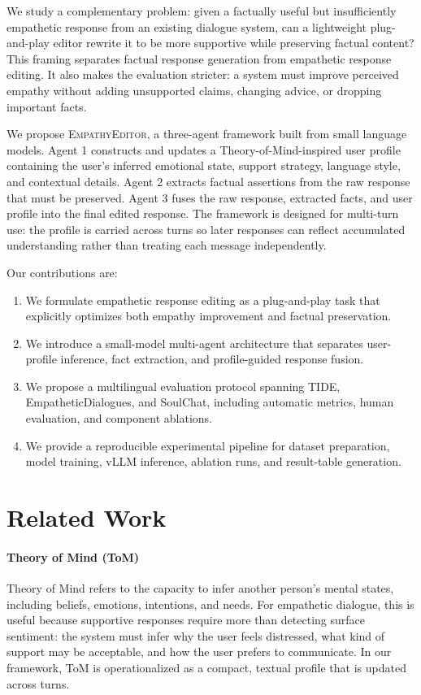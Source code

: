 \documentclass[11pt]{article}
\begin{document}
We study a complementary problem: given a factually useful but insufficiently empathetic response from an existing dialogue system, can a lightweight plug-and-play editor rewrite it to be more supportive while preserving factual content? This framing separates factual response generation from empathetic response editing. It also makes the evaluation stricter: a system must improve perceived empathy without adding unsupported claims, changing advice, or dropping important facts.

We propose \textsc{EmpathyEditor}, a three-agent framework built from small language models. Agent 1 constructs and updates a Theory-of-Mind-inspired user profile containing the user's inferred emotional state, support strategy, language style, and contextual details. Agent 2 extracts factual assertions from the raw response that must be preserved. Agent 3 fuses the raw response, extracted facts, and user profile into the final edited response. The framework is designed for multi-turn use: the profile is carried across turns so later responses can reflect accumulated understanding rather than treating each message independently.

Our contributions are:

\begin{enumerate}
    \item We formulate empathetic response editing as a plug-and-play task that explicitly optimizes both empathy improvement and factual preservation.
    \item We introduce a small-model multi-agent architecture that separates user-profile inference, fact extraction, and profile-guided response fusion.
    \item We propose a multilingual evaluation protocol spanning TIDE, EmpatheticDialogues, and SoulChat, including automatic metrics, human evaluation, and component ablations.
    \item We provide a reproducible experimental pipeline for dataset preparation, model training, vLLM inference, ablation runs, and result-table generation.
\end{enumerate}
\section{Related Work}

\paragraph{Theory of Mind (ToM)}
Theory of Mind refers to the capacity to infer another person's mental states, including beliefs, emotions, intentions, and needs. For empathetic dialogue, this is useful because supportive responses require more than detecting surface sentiment: the system must infer why the user feels distressed, what kind of support may be acceptable, and how the user prefers to communicate. In our framework, ToM is operationalized as a compact, textual profile that is updated across turns.
\end{document}
